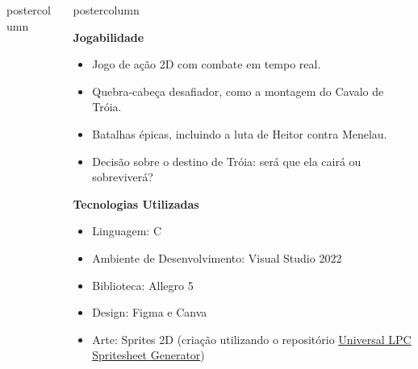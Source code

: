 \documentclass[final,hyperref={pdfpagelabels=false}]{beamer}
\newlength{\columnheight}
\begin{document}
\begin{frame}
\begin{columns}
\begin{column}{.49\textwidth}
\begin{beamercolorbox}[center,wd=\textwidth]{postercolumn}
\begin{minipage}[T]{.85\textwidth}
{                    }
                \end{minipage}
            \end{beamercolorbox}
        \end{column}

        \begin{column}{.49\textwidth}
            \begin{beamercolorbox}[center,wd=\textwidth]{postercolumn}
                \begin{minipage}[T]{.95\textwidth} 
                    \parbox[t][\columnheight]{\textwidth}{ 
                        \begin{block}{\textbf{Jogabilidade}}
                            \begin{itemize}
                                \item Jogo de ação 2D com combate em tempo real.
                                \item Quebra-cabeça desafiador, como a montagem do Cavalo de Tróia.
                                \item Batalhas épicas, incluindo a luta de Heitor contra Menelau.
                                \item Decisão sobre o destino de Tróia: será que ela cairá ou sobreviverá?
                            \end{itemize}
                        \end{block}
                        
                        \begin{block}{\textbf{Tecnologias Utilizadas}}
                            \begin{itemize}
                                \item Linguagem: C
                                \item Ambiente de Desenvolvimento: Visual Studio 2022
                                \item Biblioteca: Allegro 5
                                \item Design: Figma e Canva
                                \item Arte: Sprites 2D (criação utilizando o repositório \href{https://sanderfrenken.github.io/Universal-LPC-Spritesheet-Character-Generator/}{Universal LPC Spritesheet Generator})


\end{itemize}
\end{block}}
\end{minipage}
\end{beamercolorbox}
\end{column}
\end{columns}
\end{frame}
\end{document}
